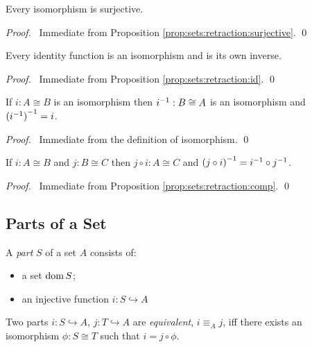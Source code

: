 \begin{prop}
Every isomorphism is surjective.
\end{prop}

\begin{proof}
\pf\ Immediate from Proposition \ref{prop:sets:retraction:surjective}. \qed
\end{proof}

\begin{prop}
\label{prop:sets:isomorphism:identity}
Every identity function is an isomorphism and is its own inverse.
\end{prop}

\begin{proof}
\pf\ Immediate from Proposition \ref{prop:sets:retraction:id}. \qed
\end{proof}

\begin{prop}
\label{prop:sets:isomorphism:inverse}
If $i : A \cong B$ is an isomorphism then ${i}^{-1} : B \cong A$ is an
isomorphism and ${({i}^{-1})}^{-1} = i$.
\end{prop}

\begin{proof}
\pf\ Immediate from the definition of isomorphism. \qed
\end{proof}

\begin{prop}
  \label{prop:sets:isomorphism:comp}
If $i : A \cong B$ and $j : B \cong C$ then $j \circ i : A \cong C$ and
${(j \circ i)}^{-1} = {i}^{-1} \circ {j}^{-1}$.
\end{prop}

\begin{proof}
\pf\ Immediate from Proposition \ref{prop:sets:retraction:comp}. \qed
\end{proof}


\subsection{Parts of a Set}

\begin{df}[Part]
  A \emph{part} $S$ of a set $A$ consists of:
  \begin{itemize}
   \item a set $\operatorname{dom} S$;
   \item an injective function $i : S \hookrightarrow A$
  \end{itemize}
\end{df}

\begin{df}
  Two parts $i : S \hookrightarrow A$, $j : T \hookrightarrow A$ are
  \emph{equivalent}, $i \equiv_A j$, iff there exists an isomorphism $\phi :
S \cong T$ such that $i = j \circ \phi$.
\end{df}

